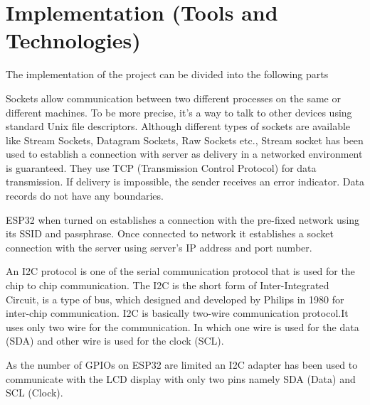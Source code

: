 \documentclass[12pt,a4paper]{article}
\begin{document}
        \section{Implementation (Tools and Technologies)}
        The implementation of the project can be divided into the following parts
        \begin{info}
        Sockets allow communication between two different processes on the same or different machines. To be more precise, it's a way to talk to other devices using standard Unix file descriptors. Although different types of sockets are available like Stream Sockets, Datagram Sockets, Raw Sockets etc., Stream socket has been used to establish a connection with server as delivery in a networked environment is guaranteed. They use TCP (Transmission Control Protocol) for data transmission. If delivery is impossible, the sender receives an error indicator. Data records do not have any boundaries.
        
        ESP32 when turned on establishes a connection with the pre-fixed network using its SSID and passphrase. Once connected to network it establishes a socket connection with the server using server's IP address and port number.
		\end{info}	
		\begin{info}
		An I2C protocol is one of the serial communication protocol that is used for the chip to chip communication. The I2C is the short form of Inter-Integrated Circuit, is a type of bus, which designed and developed by Philips in 1980 for inter-chip communication. I2C is basically two-wire communication protocol.It uses only two wire for the communication. In which one wire is used for the data (SDA) and other wire is used for the clock (SCL).
		
		As the number of GPIOs on ESP32 are limited an I2C adapter has been used to communicate with the LCD display with only two pins namely SDA (Data) and SCL (Clock).
		\end{info}
		
\end{document}
